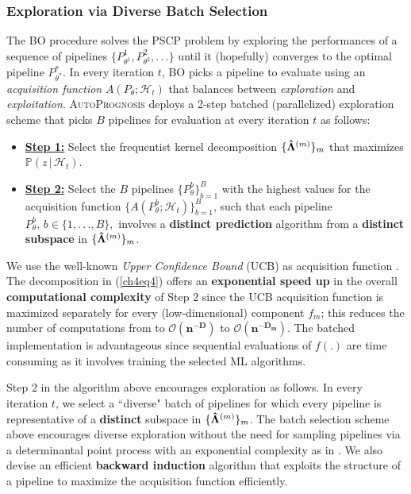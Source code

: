 \documentclass [PhD] {uclathes}
\begin{document}
\subsubsection{Exploration via Diverse Batch Selection} %
\label{BatchSec}
The BO procedure solves the PSCP problem by exploring the performances of a sequence of pipelines \mbox{\footnotesize $\{P^1_{\theta^1},P^2_{\theta^2},.\,.\,.\}$} until it (hopefully) converges to the optimal pipeline \mbox{\footnotesize $P^*_{\theta^*}$}. In every iteration \mbox{\footnotesize $t$}, BO picks a pipeline to evaluate using an {\it acquisition function} \mbox{\footnotesize $A(P_\theta; \mathcal{H}_{t})$} that balances between {\it exploration} and {\it exploitation}. \textsc{AutoPrognosis} deploys a 2-step batched (parallelized) exploration scheme that picks \mbox{\footnotesize $B$} pipelines for evaluation at every iteration \mbox{\footnotesize $t$} as follows: 

\begin{itemize}
\item {\bf \underline{Step 1:}} Select the frequentist kernel decomposition \mbox{\footnotesize $\{{\bf \hat{\Lambda}}^{(m)}\}_m$} that maximizes \mbox{\footnotesize $\mathbb{P}(z\,|\,\mathcal{H}_t)$}.
\item {\bf \underline{Step 2:}} Select the $B$ pipelines $\{P^{b}_\theta\}^B_{b=1}$ with the highest values for the acquisition function $\{A(P^b_\theta; \mathcal{H}_{t})\}^B_{b=1}$, such that each pipeline $P^{b}_\theta,\, b \in \{1,.\,.\,.,B\},$ involves a {\bf distinct prediction} algorithm from a {\bf distinct subspace} in \mbox{\footnotesize $\{{\bf \hat{\Lambda}}^{(m)}\}_m$}.
\end{itemize}
  
We use the well-known {\it Upper Confidence Bound} (UCB) as acquisition function \cite{snoek2012practical}. The decomposition in (\ref{ch4eq4}) offers an {\bf exponential speed up} in the overall {\bf computational complexity} of Step 2 since the UCB acquisition function is maximized separately for every (low-dimensional) component $f_m$; this reduces the number of computations from to \mbox{\footnotesize $\boldsymbol{\mathcal{O}(n^{-D})}$} to \mbox{\footnotesize $\boldsymbol{\mathcal{O}(n^{-D_m})}$}. The batched implementation is advantageous since sequential evaluations of \mbox{\footnotesize $f(.)$} are time consuming as it involves training the selected ML algorithms. 

Step 2 in the algorithm above encourages exploration as follows. In every iteration $t$, we select a ``diverse" batch of pipelines for which every pipeline is representative of a {\bf distinct} subspace in \mbox{\footnotesize $\{{\bf \hat{\Lambda}}^{(m)}\}_m$}. The batch selection scheme above encourages diverse exploration without the need for sampling pipelines via a determinantal point process with an exponential complexity as in \cite{kathuria2016batched,nikolov2015randomized,wang2017batched}. We also devise an efficient {\bf backward induction} algorithm that exploits the structure of a pipeline to maximize the acquisition function efficiently. 
\end{document}

